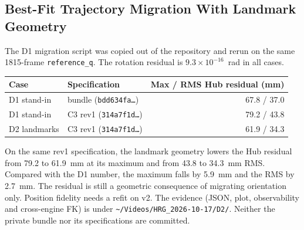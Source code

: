 \documentclass[11pt,a4paper]{article}
\begin{document}
\subsection{Best-Fit Trajectory Migration With Landmark Geometry}
The D1 migration script was copied out of the repository and rerun on the
same 1815-frame \texttt{reference\_q}. The rotation residual is
$9.3\times10^{-16}$~rad in all cases.
\begin{center}
\begin{tabular}{llr}
Case & Specification & Max / RMS Hub residual (mm) \\
\hline
D1 stand-in & bundle (\texttt{bdd634fa\ldots}) & 67.8 / 37.0 \\
D1 stand-in & C3 rev1 (\texttt{314a7f1d\ldots}) & 79.2 / 43.8 \\
D2 landmarks & C3 rev1 (\texttt{314a7f1d\ldots}) & 61.9 / 34.3 \\
\end{tabular}
\end{center}
On the same rev1 specification, the landmark geometry lowers the Hub residual
from 79.2 to 61.9~mm at its maximum and from 43.8 to 34.3~mm RMS. Compared
with the D1 number, the maximum falls by 5.9~mm and the RMS by 2.7~mm. The
residual is still a geometric consequence of migrating orientation only.
Position fidelity needs a refit on v2. The evidence (JSON, plot, observability
and cross-engine FK) is under
\texttt{\textasciitilde/Videos/HRG\_2026-10-17/D2/}. Neither the private
bundle nor its specifications are committed.
\end{document}
